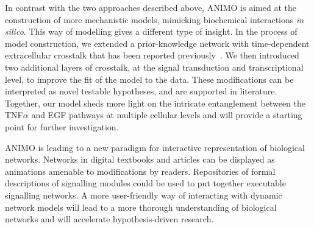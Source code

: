 In contrast with the two approaches described above, ANIMO is aimed at the construction of
more mechanistic models, mimicking biochemical interactions \emph{in silico}. This way of modelling
gives a different type of insight. In the process of model construction, we extended a
prior-knowledge network with time-dependent extracellular crosstalk that has been reported
previously~\citep{pathway-autocrine}. We then introduced two additional layers of
crosstalk, at the signal transduction and transcriptional level, to
improve the fit of the model to the data. These modifications can be interpreted as novel testable hypotheses,
and are supported in literature.
Together, our model sheds more light on the intricate
entanglement between the TNF$\alpha$ and EGF pathways at multiple cellular levels and will
provide a starting point for further investigation.

ANIMO is leading to a new paradigm for interactive
representation of biological networks. Networks in digital textbooks and articles can be
displayed as animations amenable to modifications by readers. Repositories of formal
descriptions of signalling modules could be used to put together executable signalling
networks. A more user-friendly way of interacting with dynamic network models will lead to a
more thorough understanding of biological networks and will accelerate hypothesis-driven
research.
